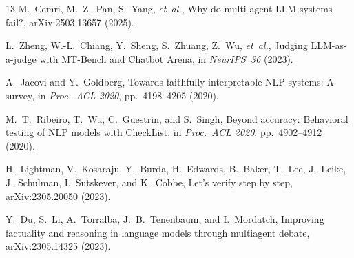 \documentclass[aps,prx,reprint,twocolumn,superscriptaddress,longbibliography]{revtex4-2}
\begin{document}
\begin{thebibliography}{13}
M.~Cemri, M.~Z.~Pan, S.~Yang, \emph{et~al.},
Why do multi-agent LLM systems fail?,
arXiv:2503.13657 (2025).

L.~Zheng, W.-L.~Chiang, Y.~Sheng, S.~Zhuang, Z.~Wu, \emph{et~al.},
Judging LLM-as-a-judge with MT-Bench and Chatbot Arena,
in \emph{NeurIPS~36} (2023).

A.~Jacovi and Y.~Goldberg,
Towards faithfully interpretable NLP systems: A survey,
in \emph{Proc.\ ACL 2020}, pp.~4198--4205 (2020).

M.~T.~Ribeiro, T.~Wu, C.~Guestrin, and S.~Singh,
Beyond accuracy: Behavioral testing of NLP models with CheckList,
in \emph{Proc.\ ACL 2020}, pp.~4902--4912 (2020).

H.~Lightman, V.~Kosaraju, Y.~Burda, H.~Edwards, B.~Baker, T.~Lee, J.~Leike, J.~Schulman, I.~Sutskever, and K.~Cobbe,
Let's verify step by step,
arXiv:2305.20050 (2023).

Y.~Du, S.~Li, A.~Torralba, J.~B.~Tenenbaum, and I.~Mordatch,
Improving factuality and reasoning in language models through multiagent debate,
arXiv:2305.14325 (2023).

\end{thebibliography}
\end{document}
